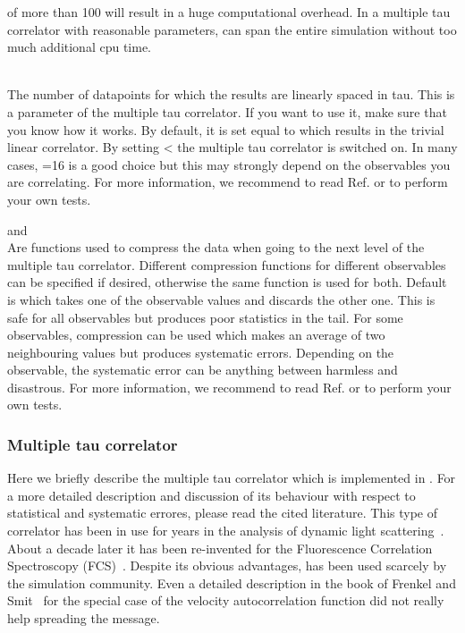 \begin{arguments}
{  of more than 100 will result in a huge computational overhead.
  In a multiple tau correlator with reasonable parameters, 
   can span the entire simulation without
  too much additional cpu time.}
\item {} \\
  The number of datapoints for which the results are linearly spaced in tau. 
  This is a parameter of the multiple tau correlator. If you want to use it, make sure that
  you know how it works. By default, it is set equal to  which results
  in the trivial linear correlator. By setting  <  the multiple
  tau correlator is switched on. In many cases, =16 is a good choice
  but this may strongly depend on the observables you are correlating.
  For more information, we recommend to read Ref.\cite{ramirez10a} or to perform
  your own tests.
\item {} and  \\
  Are functions used to compress the data when going to the next level of the 
  multiple tau correlator. Different compression functions for different observables
  can be specified if desired, otherwise the same function is used for both.
  Default is  which takes one of the observable
  values and discards the other one. This is safe for all observables but produces poor 
  statistics in the tail. For some observables,  compression can be used which
  makes an average of two neighbouring values but produces systematic errors.
  Depending on the observable, the systematic error can be anything between
  harmless and disastrous. For more information, we recommend to read 
  Ref.\cite{ramirez10a} or to perform your own tests.
\end{arguments}

\subsubsection{Multiple tau correlator}
\label{sec:multipleTau}
Here we briefly describe the multiple tau correlator which is implemented in \es.
For a more detailed description and discussion of its behaviour with respect to
statistical and systematic errores, please read the cited literature.
This type of correlator has been in use for years in the analysis of
dynamic light scattering~\cite{dls}. About a decade later it has been
re-invented for the Fluorescence Correlation Spectroscopy (FCS)~\cite{fcs}.
Despite its obvious advantages, has been used scarcely by the simulation community.
Even a detailed description in the book of Frenkel and Smit~\cite{frenkel02b}
for the special case of the velocity autocorrelation function did not really
help spreading the message.

